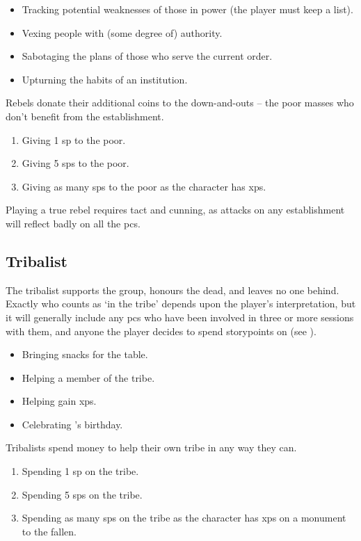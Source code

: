 \begin{multicols}{2}
\begin{itemize}
  \item
  Tracking potential weaknesses of those in power (the player must keep a list).
  \item
  Vexing people with (some degree of) authority.
  \item
  Sabotaging the plans of those who serve the current order.
  \item
  Upturning the habits of an institution.
\end{itemize}

Rebels donate their additional \glspl{coin} to the down-and-outs -- the poor masses who don't benefit from the establishment.

\begin{enumerate}
  \item
  Giving 1 \gls{sp} to the poor.
  \item
  Giving 5 \glspl{sp} to the poor.
  \item
  Giving as many \glspl{sp} to the poor as the character has \glspl{xp}.
\end{enumerate}

Playing a true rebel requires tact and cunning, as attacks on any establishment will reflect badly on all the \glspl{pc}.

\subsection{Tribalist}
\label{tribalist}

The tribalist supports the group, honours the dead, and leaves no one behind.
Exactly who counts as `in the tribe' depends upon the player's interpretation, but it will generally include any \glspl{pc} who have been involved in three or more sessions with them, and anyone the player decides to spend \glspl{storypoint} on (see ).

\begin{itemize}
  \item
  Bringing snacks for the table.
  \item
  Helping a member of the tribe.
  \item
  Helping  gain \glspl{xp}.
  \item
  Celebrating 's birthday.
\end{itemize}

Tribalists spend money to help their own tribe in any way they can.

\begin{enumerate}
  \item
  Spending 1 \gls{sp} on the tribe.
  \item
  Spending 5 \glspl{sp} on the tribe.
  \item
  Spending as many \glspl{sp} on the tribe as the character has \glspl{xp} on a monument to the fallen.
\end{enumerate}


\end{multicols}
